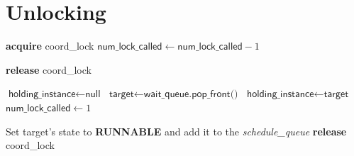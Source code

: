 \section{Unlocking}
\begin{algorithmic}[1]
    \State \textbf{acquire} \textsf{coord\_lock}
    \State $\textsf{num\_lock\_called} \gets \textsf{num\_lock\_called} - 1$
    
        \State \textbf{release} \textsf{coord\_lock}
        \State \Return
    \EndIf

        \State $\textsf{holding\_instance} \gets \textsf{null}$
    \Else
        \State $\textsf{target} \gets \textsf{wait\_queue.pop\_front()}$
        \State $\textsf{holding\_instance} \gets \textsf{target}$
        \State $\textsf{num\_lock\_called} \gets 1$
        
        \State Set \textsf{target}'s state to \textbf{RUNNABLE} and add it to the \textit{schedule\_queue}
    \EndIf
    \State \textbf{release} \textsf{coord\_lock}
\EndProcedure
\end{algorithmic}


